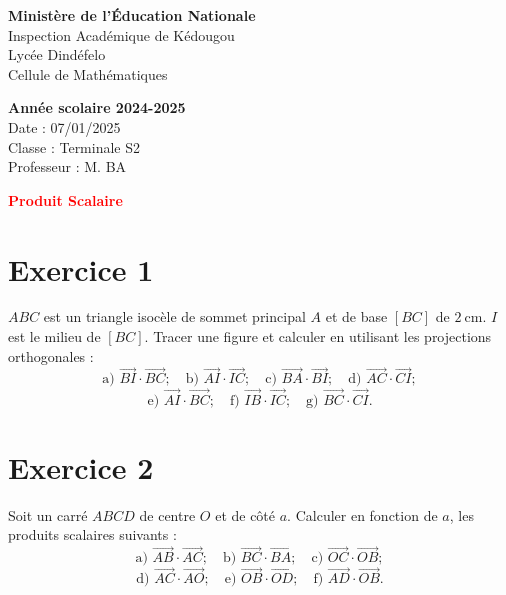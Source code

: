 \documentclass[12pt]{article}
\begin{document}
\noindent
\begin{minipage}[t]{0.48\textwidth}
\raggedright
\textbf{Ministère de l'Éducation Nationale}\\
Inspection Académique de Kédougou\\
Lycée Dindéfelo\\
Cellule de Mathématiques
\end{minipage}
\hfill
\begin{minipage}[t]{0.48\textwidth}
\raggedleft
\textbf{Année scolaire 2024-2025}\\
Date : 07/01/2025\\
Classe : Terminale S2\\
Professeur : M. BA
\end{minipage}
\vspace{1cm}
\begin{center}
\textbf{\textcolor{red}{Produit Scalaire}}
\end{center}
\vspace{1cm}
\section*{Exercice 1}

$ABC$ est un triangle isocèle de sommet principal $A$ et de base $[BC]$ de $2\ \text{cm}$. $I$ est le milieu de $[BC]$. Tracer une figure et calculer en utilisant les projections orthogonales :
\[
\text{a) } \overrightarrow{BI} \cdot \overrightarrow{BC}; \quad
\text{b) } \overrightarrow{AI} \cdot \overrightarrow{IC}; \quad
\text{c) } \overrightarrow{BA} \cdot \overrightarrow{BI}; \quad
\text{d) } \overrightarrow{AC} \cdot \overrightarrow{CI}; 
\]
\[
\text{e) } \overrightarrow{AI} \cdot \overrightarrow{BC}; \quad
\text{f) } \overrightarrow{IB} \cdot \overrightarrow{IC}; \quad
\text{g) } \overrightarrow{BC} \cdot \overrightarrow{CI}.
\]

\section*{Exercice 2}

Soit un carré $ABCD$ de centre $O$ et de côté $a$. Calculer en fonction de $a$, les produits scalaires suivants :
\[
\text{a) } \overrightarrow{AB} \cdot \overrightarrow{AC}; \quad
\text{b) } \overrightarrow{BC} \cdot \overrightarrow{BA}; \quad
\text{c) } \overrightarrow{OC} \cdot \overrightarrow{OB}; 
\]
\[
\text{d) } \overrightarrow{AC} \cdot \overrightarrow{AO}; \quad
\text{e) } \overrightarrow{OB} \cdot \overrightarrow{OD}; \quad
\text{f) } \overrightarrow{AD} \cdot \overrightarrow{OB}.
\]
\end{document}
